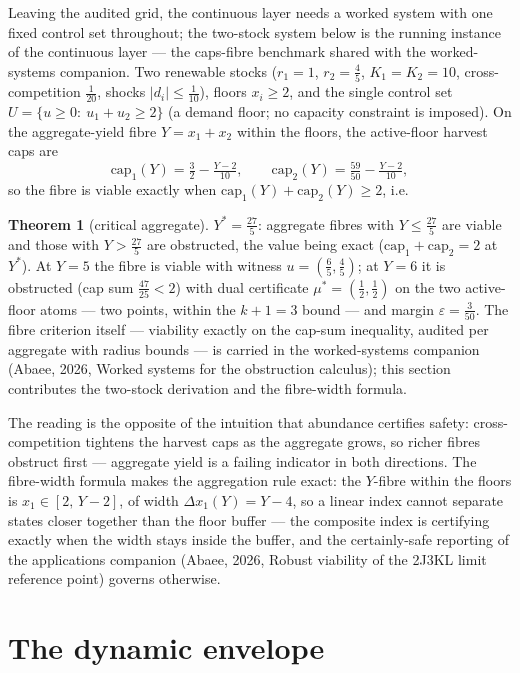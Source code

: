 \documentclass[10pt,twocolumn]{article}
\theoremstyle{definition}
\newtheorem{theorem}{Theorem}
\begin{document}
Leaving the audited grid, the continuous layer needs a worked system with
one fixed control set throughout; the two-stock system below is the
running instance of the continuous layer --- the caps-fibre benchmark
shared with the worked-systems companion. Two renewable stocks
($r_{1} = 1$, $r_{2} = \tfrac45$, $K_{1} = K_{2} = 10$, cross-competition
$\tfrac1{20}$, shocks $|d_{i}| \le \tfrac1{10}$), floors
$x_{i} \ge 2$, and the single control set
$U = \{u \ge 0:\ u_{1} + u_{2} \ge 2\}$ (a demand floor; no capacity
constraint is imposed). On the aggregate-yield fibre
$Y = x_{1} + x_{2}$ within the floors, the active-floor harvest caps are
\[
\mathrm{cap}_{1}(Y) = \tfrac32 - \tfrac{Y-2}{10},\qquad
\mathrm{cap}_{2}(Y) = \tfrac{59}{50} - \tfrac{Y-2}{10},
\]
so the fibre is viable exactly when
$\mathrm{cap}_{1}(Y) + \mathrm{cap}_{2}(Y) \ge 2$, i.e.
\begin{theorem}[critical aggregate]\label{thm:benchmark}
$Y^{*} = \tfrac{27}{5}$: aggregate fibres with $Y \le \tfrac{27}{5}$ are
viable and those with $Y > \tfrac{27}{5}$ are obstructed, the value being
exact ($\mathrm{cap}_{1} + \mathrm{cap}_{2} = 2$ at $Y^{*}$). At
$Y = 5$ the fibre is viable with witness $u = (\tfrac65,\tfrac45)$; at
$Y = 6$ it is obstructed (cap sum $\tfrac{47}{25} < 2$) with dual
certificate $\mu^{*} = (\tfrac12,\tfrac12)$ on the two active-floor
atoms --- two points, within the $k+1 = 3$ bound --- and margin
$\varepsilon = \tfrac{3}{50}$. The fibre criterion itself --- viability
exactly on the cap-sum inequality, audited per aggregate with radius
bounds --- is carried in the worked-systems companion (Abaee, 2026, Worked systems for the obstruction calculus);
this section contributes the two-stock derivation and the fibre-width
formula.
\end{theorem}
The reading is the opposite of the intuition that abundance certifies
safety: cross-competition tightens the harvest caps as the aggregate
grows, so richer fibres obstruct first --- aggregate yield is a failing
indicator in both directions. The fibre-width formula makes the
aggregation rule exact: the $Y$-fibre within the floors is
$x_{1} \in [2,\,Y-2]$, of width $\Delta x_{1}(Y) = Y - 4$, so a linear
index cannot separate states closer together than the floor buffer ---
the composite index is certifying exactly when the width stays inside the
buffer, and the certainly-safe reporting of the applications companion
(Abaee, 2026, Robust viability of the 2J3KL limit reference point) governs otherwise.

\section{The dynamic envelope}
\end{document}
